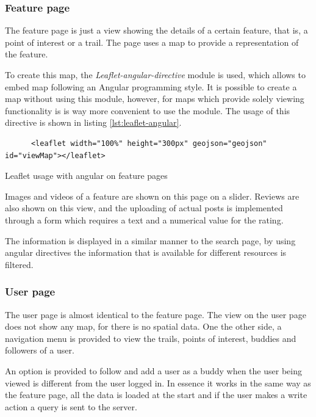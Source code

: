 \subsubsection*{Feature page}

The feature page is just a view showing the details of a certain feature, that is, a point of interest or a trail. The page uses a map to provide a representation of the feature.

To create this map, the \textit{Leaflet-angular-directive} module is used, which allows to embed map following an Angular programming style. It is possible to create a map without using this module, however, for maps which provide solely viewing functionality is is way more convenient to use the module. The usage of this directive is shown in listing \ref{lst:leaflet-angular}.

\begin{listing}[ht]\centering
  \begin{minipage}{.85\textwidth}
    \begin{verbatim}
      <leaflet width="100%" height="300px" geojson="geojson" id="viewMap"></leaflet>
    \end{verbatim}
  \end{minipage}
  \caption{Leaflet usage with angular on feature pages}\label{lst:leaflet-angular}
\end{listing}

Images and videos of a feature are shown on this page on a slider. Reviews are also shown on this view, and the uploading of actual posts is implemented through a form which requires a text and a numerical value for the rating.

The information is displayed in a similar manner to the search page, by using angular directives the information that is available for different resources is filtered.

\subsubsection*{User page}

The user page is almost identical to the feature page. The view on the user page does not show any map, for there is no spatial data. One the other side, a navigation menu is provided to view the trails, points of interest, buddies and followers of a user.

An option is provided to follow and add a user as a buddy when the user being viewed is different from the user logged in. In essence it works in the same way as the feature page, all the data is loaded at the start and if the user makes a write action a query is sent to the server.

